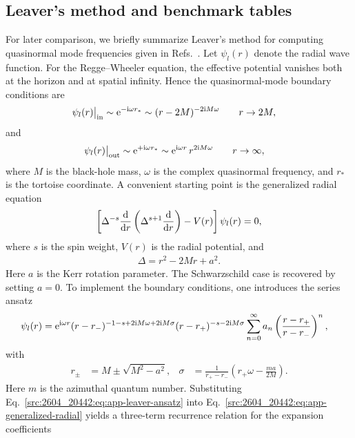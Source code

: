 \subsection{Leaver's method and benchmark tables}\label{src:2604_20442:sec:leaver}
For later comparison, we briefly summarize Leaver's method for computing
quasinormal mode frequencies given in Refs.~\cite{Leaver:1985ax,Leaver:1986gd}.
Let $\psi_{l}(r)$ denote the radial wave function.
For the Regge--Wheeler equation, the effective potential vanishes both at the horizon and at spatial infinity.
Hence the quasinormal-mode boundary conditions are
\begin{align}
 \psi_{l}(r)\big|_{\mathrm{in}}
 &\sim \mathrm{e}^{- \mathrm{i} \omega r_*}
 \sim (r-2M)^{-2 \mathrm{i} M \omega}
 \qquad
 r \to 2M,
\end{align}
and
\begin{align}
 \psi_{l}(r)\big|_{\mathrm{out}}
 &\sim \mathrm{e}^{+ \mathrm{i} \omega r_*}
 \sim \mathrm{e}^{\mathrm{i} \omega r} \, r^{2 \mathrm{i} M \omega}
 \qquad
 r \to \infty,
\end{align}
where $M$ is the black-hole mass, $\omega$ is the complex quasinormal frequency, and $r_*$ is the tortoise coordinate.
A convenient starting point is the generalized radial equation
\begin{align}
 \left[\Delta^{-s}\frac{\mathrm{d}}{\mathrm{d} r}\left(\Delta^{s+1}\frac{\mathrm{d}}{\mathrm{d} r}\right)-V(r)\right]
 \psi_{l}(r)
 =
 0,
 \label{src:2604_20442:eq:app-generalized-radial}
\end{align}
where $s$ is the spin weight, $V(r)$ is the radial potential, and
\begin{align}
\Delta = r^2 - 2 M r + a^2 .
\end{align}
Here $a$ is the Kerr rotation parameter.
The Schwarzschild case is recovered by setting $a=0$.
To implement the boundary conditions, one introduces the series ansatz
\begin{align}
 \psi_{l}(r)
 &= \mathrm{e}^{\mathrm{i} \omega r}
 (r-r_-)^{-1-s+2 \mathrm{i} M \omega + 2 \mathrm{i} M \sigma}
 (r-r_+)^{-s-2 \mathrm{i} M \sigma}
 \sum_{n=0}^{\infty} a_n
 \left( \frac{r-r_+}{r-r_-} \right)^n ,
 \label{src:2604_20442:eq:app-leaver-ansatz}
\end{align}
with
\begin{align}
 r_{\pm} &= M \pm \sqrt{M^2-a^2},
 &
 \sigma &= \frac{1}{r_+ - r_-} \left( r_+ \omega - \frac{m a}{2M} \right).
\end{align}
Here $m$ is the azimuthal quantum number.
Substituting Eq.~\eqref{src:2604_20442:eq:app-leaver-ansatz} into Eq.~\eqref{src:2604_20442:eq:app-generalized-radial} yields a three-term recurrence relation for the expansion coefficients
